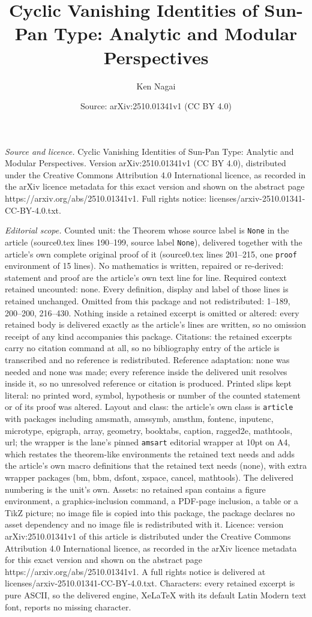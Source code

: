 \documentclass[10pt,a4paper]{amsart}
\title[Cyclic Vanishing Identities of Sun-Pan Type: Analytic and Mo]{Cyclic Vanishing Identities of Sun-Pan Type: Analytic and Modular Perspectives}
\author{Ken Nagai}
\date{Source: arXiv:2510.01341v1 (CC BY 4.0)}
\begin{document}
\maketitle

\noindent\emph{Source and licence.} Cyclic Vanishing Identities of Sun-Pan Type: Analytic and Modular Perspectives. Version arXiv:2510.01341v1 (CC BY 4.0), distributed under the Creative Commons Attribution 4.0 International licence, as recorded in the arXiv licence metadata for this exact version and shown on the abstract page https://arxiv.org/abs/2510.01341v1. Full rights notice: licenses/arxiv-2510.01341-CC-BY-4.0.txt.\par\smallskip

\noindent\textit{Editorial scope.} Counted unit: the Theorem whose source label is \texttt{None} in the article (source0.tex lines 190--199, source label \texttt{None}), delivered together with the article's own complete original proof of it (source0.tex lines 201--215, one \texttt{proof} environment of 15 lines). No mathematics is written, repaired or re-derived: statement and proof are the article's own text line for line. Required context retained uncounted: none. Every definition, display and label of those lines is retained unchanged. Omitted from this package and not redistributed: 1--189, 200--200, 216--430. Nothing inside a retained excerpt is omitted or altered: every retained body is delivered exactly as the article's lines are written, so no omission receipt of any kind accompanies this package. Citations: the retained excerpts carry no citation command at all, so no bibliography entry of the article is transcribed and no reference is redistributed. Reference adaptation: none was needed and none was made; every reference inside the delivered unit resolves inside it, so no unresolved reference or citation is produced. Printed slips kept literal: no printed word, symbol, hypothesis or number of the counted statement or of its proof was altered. Layout and class: the article's own class is \texttt{article} with packages including amsmath, amssymb, amsthm, fontenc, inputenc, microtype, epigraph, array, geometry, booktabs, caption, ragged2e, mathtools, url; the wrapper is the lane's pinned \texttt{amsart} editorial wrapper at 10pt on A4, which restates the theorem-like environments the retained text needs and adds the article's own macro definitions that the retained text needs (none), with extra wrapper packages (bm, bbm, dsfont, xspace, cancel, mathtools). The delivered numbering is the unit's own. Assets: no retained span contains a figure environment, a graphics-inclusion command, a PDF-page inclusion, a table or a TikZ picture; no image file is copied into this package, the package declares no asset dependency and no image file is redistributed with it. Licence: version arXiv:2510.01341v1 of this article is distributed under the Creative Commons Attribution 4.0 International licence, as recorded in the arXiv licence metadata for this exact version and shown on the abstract page https://arxiv.org/abs/2510.01341v1. A full rights notice is delivered at licenses/arxiv-2510.01341-CC-BY-4.0.txt. Characters: every retained excerpt is pure ASCII, so the delivered engine, XeLaTeX with its default Latin Modern text font, reports no missing character.
\end{document}
